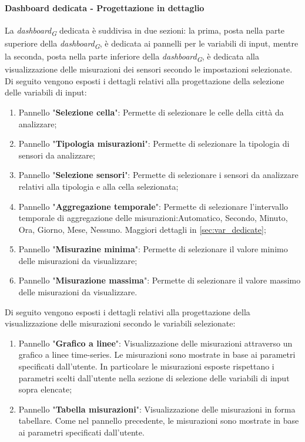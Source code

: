 \paragraph*{Dashboard dedicata - Progettazione in dettaglio}
La \textit{dashboard}\textsubscript{\textit{G}} dedicata è suddivisa in due sezioni: la prima, posta nella parte superiore della \textit{dashboard}\textsubscript{\textit{G}}, è dedicata ai pannelli per le variabili di input, mentre la seconda, posta nella parte inferiore della \textit{dashboard}\textsubscript{\textit{G}}, è dedicata alla visualizzazione delle misurazioni dei sensori secondo le impostazioni selezionate.\\
Di seguito vengono esposti i dettagli relativi alla progettazione della selezione delle variabili di input:
\begin{enumerate}
    \item Pannello "\textbf{Selezione cella}": Permette di selezionare le celle della città da analizzare;
    \item Pannello "\textbf{Tipologia misurazioni}": Permette di selezionare la tipologia di sensori da analizzare;
    \item Pannello "\textbf{Selezione sensori}": Permette di selezionare i sensori da analizzare relativi alla tipologia e alla cella selezionata;
    \item Pannello "\textbf{Aggregazione temporale}": Permette di selezionare l'intervallo temporale di aggregazione delle misurazioni:{Automatico, Secondo, Minuto, Ora, Giorno, Mese, Nessuno}. Maggiori dettagli in \ref{sec:var_dedicate};
    \item Pannello "\textbf{Misurazine minima}": Permette di selezionare il valore minimo delle misurazioni da visualizzare;
    \item Pannello "\textbf{Misurazione massima}": Permette di selezionare il valore massimo delle misurazioni da visualizzare.
\end{enumerate}
Di seguito vengono esposti i dettagli relativi alla progettazione della visualizzazione delle misurazioni secondo le variabili selezionate:
\begin{enumerate}
    \item Pannello "\textbf{Grafico a linee}": Visualizzazione delle misurazioni attraverso un grafico a linee time-series. Le misurazioni sono mostrate in base ai parametri specificati dall’utente. In particolare le misurazioni esposte rispettano i parametri scelti dall'utente nella sezione di selezione delle variabili di input sopra elencate;
    \item Pannello "\textbf{Tabella misurazioni}": Visualizzazione delle misurazioni in forma tabellare. Come nel pannello precedente, le misurazioni sono mostrate in base ai parametri specificati dall'utente.
\end{enumerate}

